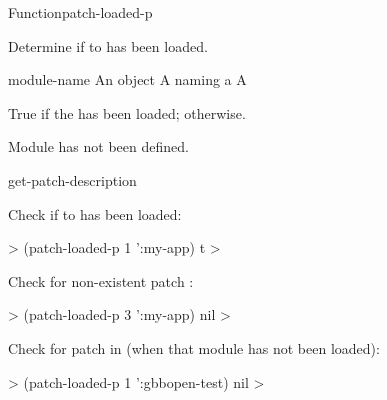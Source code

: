 \documentclass[10pt,twoside,english,pdftex]{article}
\begin{document}

\begin{functiondoc}{Function}{patch-loaded-p}%
  {
    \returns{} }
%
%

\fnsyntax 

\fnpurpose Determine if   to  has been
loaded.

\fnpackage {}

\fnmodule {}

\fnargs
\begin{args}{module-name}
\arg[id] An object
 A  naming a 
\arg[boolean] A 
\end{args}

\fnreturns True if the  has been loaded; \nil{} otherwise.

\fnerrors Module  has not been defined.\\

\begin{alsos}{get-patch-description}
\also[patch]
\end{alsos}

\fnexamples
%
Check if   to   has been
loaded:
%
\W\supp
\begin{example}
  > (patch-loaded-p 1 ':my-app)
  t
  >
\end{example}

Check for non-existent patch :
%
\W\supp
\begin{example}
  > (patch-loaded-p 3 ':my-app)
  nil
  >
\end{example}

Check for patch  in   (when that
module has not been loaded):
%
\W\supp
\begin{example}
  > (patch-loaded-p 1 ':gbbopen-test)
  nil
  >
\end{example}

\end{functiondoc}

\end{document}
